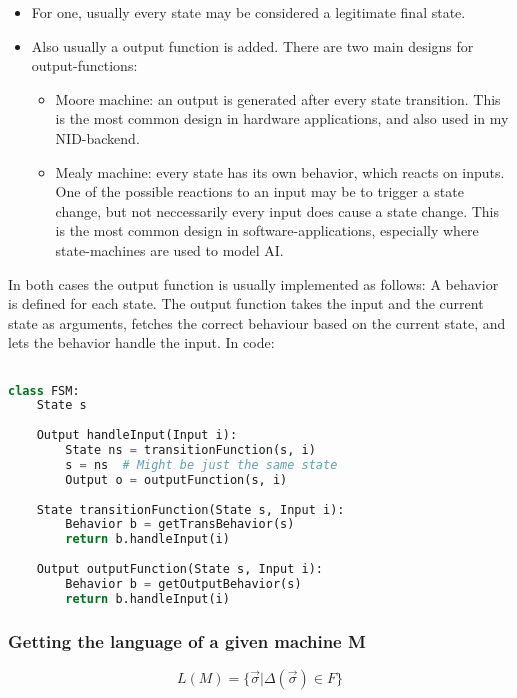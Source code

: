 \begin{itemize}
    \item For one, usually every state may be considered a legitimate final state.
    \item Also usually a output function is added. There are two main designs for output-functions:
    \begin{itemize}
        \item Moore machine: an output is generated after every state transition. This is the most common design in hardware applications, and also used in my NID-backend.
        \item Mealy machine: every state has its own behavior, which reacts on inputs. One of the possible reactions to an input may be to trigger a state change, but not neccessarily every input does cause a state change. This is the most common design in software-applications, especially where state-machines are used to model AI.
    \end{itemize}
\end{itemize}

In both cases the output function is usually implemented as follows:
A behavior is defined for each state. 
The output function takes the input and the current state as arguments, fetches the correct behaviour based on the current state, and lets the behavior handle the input. In code:

\begin{lstlisting}[language=Python]

class FSM:
    State s
    
    Output handleInput(Input i):
        State ns = transitionFunction(s, i)
        s = ns  # Might be just the same state
        Output o = outputFunction(s, i)
        
    State transitionFunction(State s, Input i):
        Behavior b = getTransBehavior(s)
        return b.handleInput(i)
    
    Output outputFunction(State s, Input i):
        Behavior b = getOutputBehavior(s)
        return b.handleInput(i)


\end{lstlisting}

\subsubsection{Getting the language of a given machine M}

\begin{equation}
L(M) = \{  \vec{\sigma} | \Delta(\vec{\sigma}) \in F \}
\end{equation}

